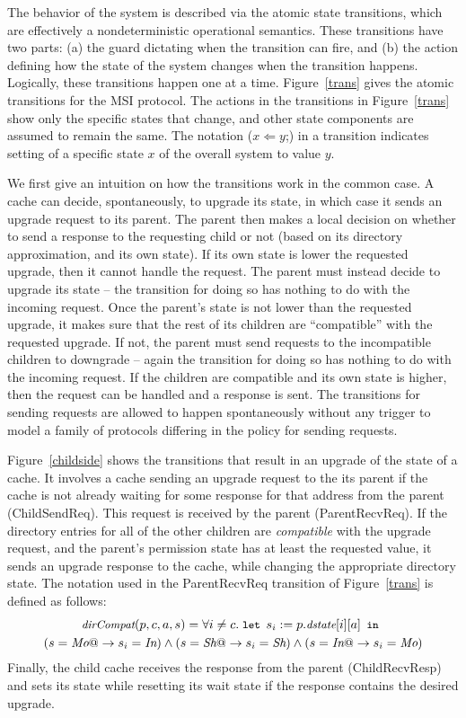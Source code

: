 The behavior of the system is described via the atomic state transitions, which
are effectively a nondeterministic operational semantics. These transitions
have two parts: (a) the guard dictating when the transition can fire, and (b)
the action defining how the state of the system changes when the transition
happens. Logically, these transitions happen one at a time.  Figure~\ref{trans}
gives the atomic transitions for the MSI protocol.  The actions in the
transitions in Figure~\ref{trans} show only the specific states that change,
and other state components are assumed to remain the same.  The notation ($x
\Leftarrow y$;) in a transition indicates setting of a specific state $x$ of
the overall system to value $y$.

We first give an intuition on how the transitions work in the common case.
A cache can decide, spontaneously, to upgrade its state,
in which case it sends an upgrade request to its parent. The parent then makes
a local decision on whether to send a response to the requesting child or not
(based on its directory approximation, and its own state). If its own state is
lower the requested upgrade, then it cannot handle the request. The parent
must instead decide to upgrade its state -- the transition for doing so has
nothing to do with the incoming request.  Once the parent's state is not lower
than the requested upgrade, it makes sure that the rest of its children are
``compatible'' with the requested upgrade. If not, the parent must send
requests to the incompatible children to downgrade -- again the transition for
doing so has nothing to do with the incoming request. If the children are
compatible and its own state is higher, then the request can be handled and a
response is sent. The transitions for sending requests are allowed to happen
spontaneously without any trigger to model a family of protocols differing in
the policy for sending requests.

Figure~\ref{childside} shows the transitions that result in an upgrade of the
state of a cache. It involves a cache sending an upgrade request to the its
parent if the cache is not already waiting for some response for that address
from the parent (ChildSendReq). This request is received by the parent
(ParentRecvReq). If the directory entries for all of the other children are
\emph{compatible} with the upgrade request, and the parent's permission state has
at least the requested value, it sends an upgrade response to the cache, while
changing the appropriate directory state. The notation \compat{} used in
the ParentRecvReq transition of Figure~\ref{trans} is defined as follows:
\begin{multline*}
\small
\compat(p, c, a, s) = \forall i \ne c. \;
\mylet s_i := p.\dstate[i][a] \myin\\
 (s = \Mo @-> s_i = \In) \wedge (s = \Sh @-> s_i = \Sh) \wedge (s = \In @-> s_i = \Mo)
\end{multline*}
Finally, the child cache receives the response from the parent (ChildRecvResp)
and sets its state while resetting its wait state if the response contains the
desired upgrade.

